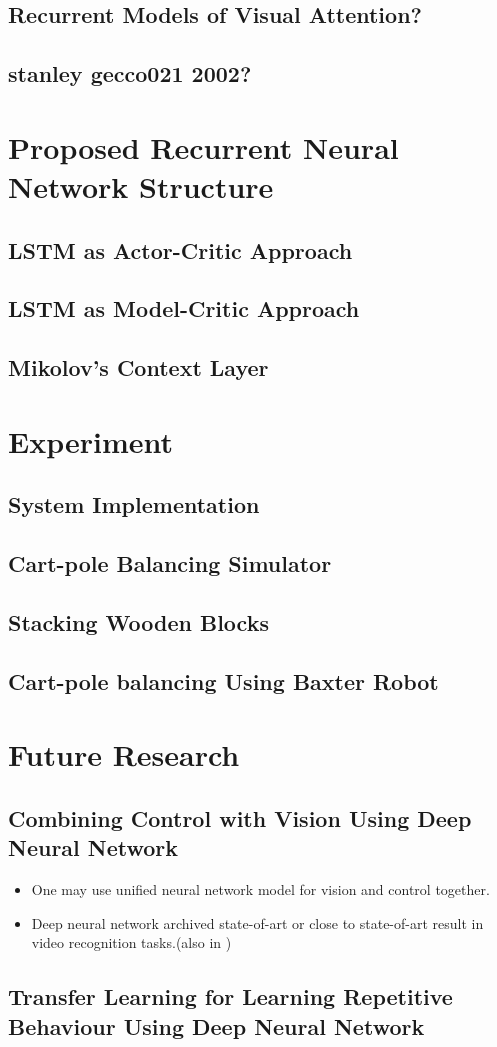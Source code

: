 \documentclass[officiallayout]{tktla}
\begin{document}
\section{Recurrent Models of Visual Attention?}       
\section{stanley gecco021 2002?}

\chapter{Proposed Recurrent Neural Network Structure}
\section{LSTM as Actor-Critic Approach}
\section{LSTM as Model-Critic Approach}
\section{Mikolov's Context Layer}

\chapter{Experiment}
\section{System Implementation}
\section{Cart-pole Balancing Simulator}
\section{Stacking Wooden Blocks}
\section{Cart-pole balancing Using Baxter Robot}

\chapter{Future Research}
\section{Combining Control with Vision Using Deep Neural Network}
\begin{itemize}
\item One may use unified neural network model for vision and control together.
\item Deep neural network archived state-of-art or close to state-of-art result in video recognition tasks.(also in )
\end{itemize}
\section{Transfer Learning for Learning Repetitive Behaviour Using Deep Neural Network}





\end{document}
